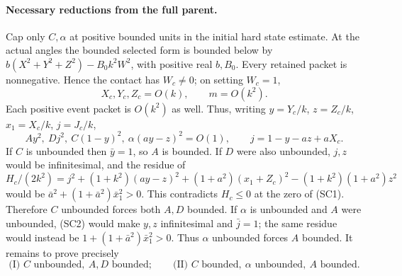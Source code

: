 \paragraph{Necessary reductions from the full parent.}
Cap only $C,\alpha$ at positive bounded units in the initial hard
state estimate. At the actual angles the bounded selected form is
bounded below by
$b(X^2+Y^2+Z^2)-B_0k^2W^2$, with positive real $b,B_0$.
Every retained packet is nonnegative. Hence the contact has $W_c\ne0$;
on setting $W_c=1$,
\[
 X_c,Y_c,Z_c=O(k),\qquad m=O(k^2).
\]
Each positive event packet is $O(k^2)$ as well. Thus, writing
$y=Y_c/k$, $z=Z_c/k$, $x_1=X_c/k$, $j=J_c/k$,
\[
 Ay^2,\ Dj^2,\ C(1-y)^2,\ \alpha(ay-z)^2=O(1),\qquad
 j=1-y-az+aX_c.                                      \tag{SC2}
\]
If $C$ is unbounded then $\bar y=1$, so $A$ is bounded. If $D$
were also unbounded, $j,z$ would be infinitesimal, and the residue of
\[
 H_c/(2k^2)=j^2+(1+k^2)(ay-z)^2
            +(1+a^2)(x_1+Z_c)^2-(1+k^2)(1+a^2)z^2
\]
would be $\bar a^2+(1+\bar a^2)\bar x_1^2>0$.
This contradicts $H_c\leq0$ at the zero of (SC1). Therefore
$C$ unbounded forces both $A,D$ bounded. If $\alpha$ is unbounded
and $A$ were unbounded, (SC2) would make $y,z$ infinitesimal and
$\bar j=1$; the same residue would instead be
$1+(1+\bar a^2)\bar x_1^2>0$. Thus $\alpha$ unbounded forces $A$
bounded. It remains to prove precisely
\[
 \text{(I) } C\text{ unbounded},\ A,D\text{ bounded};\qquad
 \text{(II) } C\text{ bounded},\ \alpha\text{ unbounded},\ A\text{ bounded}.
                                                               \tag{SC3}
\]

